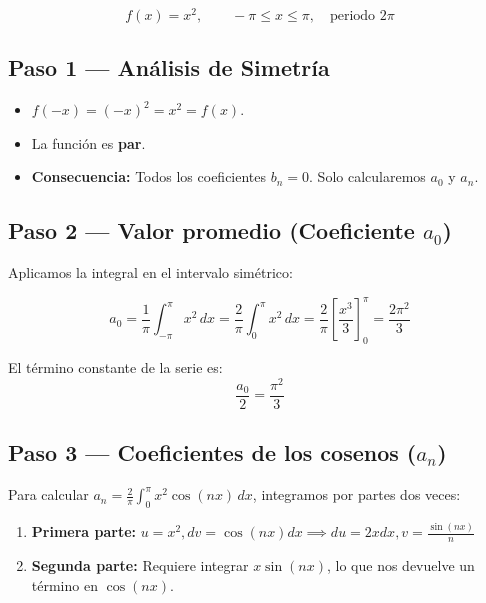 \documentclass[
  letterpaper,
  DIV=11,
  numbers=noendperiod]{scrreprt}
\providecommand{\tightlist}{%
  \setlength{\itemsep}{0pt}\setlength{\parskip}{0pt}}
\begin{document}
\[
f(x) = x^2, \qquad -\pi \le x \le \pi, \quad \text{periodo } 2\pi
\]

\subsection{Paso 1 --- Análisis de
Simetría}\label{paso-1-anuxe1lisis-de-simetruxeda-3}

\begin{itemize}
\tightlist
\item
  \(f(-x) = (-x)^2 = x^2 = f(x)\).
\item
  La función es \textbf{par}.
\item
  \textbf{Consecuencia:} Todos los coeficientes \(b_n = 0\). Solo
  calcularemos \(a_0\) y \(a_n\).
\end{itemize}

\subsection{\texorpdfstring{Paso 2 --- Valor promedio (Coeficiente
\(a_0\))}{Paso 2 --- Valor promedio (Coeficiente a\_0)}}\label{paso-2-valor-promedio-coeficiente-a_0-2}

Aplicamos la integral en el intervalo simétrico:

\[
a_0 = \frac{1}{\pi}\int_{-\pi}^{\pi} x^2\,dx = \frac{2}{\pi}\int_0^{\pi} x^2\,dx = \frac{2}{\pi} \left[ \frac{x^3}{3} \right]_0^{\pi} = \frac{2\pi^2}{3}
\]

El término constante de la serie es: \[\frac{a_0}{2} = \frac{\pi^2}{3}\]

\subsection{\texorpdfstring{Paso 3 --- Coeficientes de los cosenos
(\(a_n\))}{Paso 3 --- Coeficientes de los cosenos (a\_n)}}\label{paso-3-coeficientes-de-los-cosenos-a_n-2}

Para calcular \(a_n = \frac{2}{\pi}\int_0^{\pi} x^2\cos(nx)\,dx\),
integramos por partes dos veces:

\begin{enumerate}
\def\labelenumi{\arabic{enumi}.}
\tightlist
\item
  \textbf{Primera parte:}
  \(u = x^2, dv = \cos(nx)dx \implies du = 2xdx, v = \frac{\sin(nx)}{n}\)
\item
  \textbf{Segunda parte:} Requiere integrar \(x\sin(nx)\), lo que nos
  devuelve un término en \(\cos(nx)\).
\end{enumerate}
\end{document}
